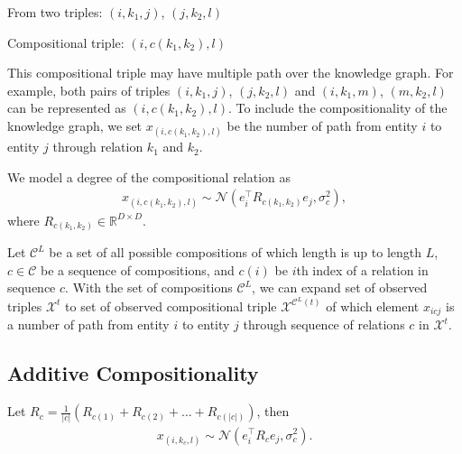 \documentclass{article}
\begin{document}
From two triples:
$(i, k_1 ,j)$,  $(j, k_2, l)$

Compositional triple:
$(i, {c}(k_1, k_2), l)$

This compositional triple may have multiple path over the knowledge graph. For example, both pairs of triples $(i, k_1 ,j)$,  $(j, k_2, l)$ and $(i, k_1 ,m)$,  $(m, k_2, l)$ can be represented as $(i, {c}(k_1, k_2), l)$. To include the compositionality of the knowledge graph, we set  $x_{(i, {{c}(k_1, k_2)}, l)}$ be the number of path from entity $i$ to entity $j$ through relation $k_1$ and $k_2$.

We model a degree of the compositional relation as
\begin{align}
x_{(i, {{c}(k_1, k_2)}, l)} \sim \mathcal{N}(e_i^\top R_{{c}(k_1,k_2)} e_j, \sigma_{c}^2),
\end{align}
where $R_{{c}(k_1,k_2)} \in \mathbb{R}^{D\times D}$.

Let $\mathcal{C}^{L}$ be a set of all possible compositions of which length is up to length $L$, $c \in \mathcal{C}$ be a sequence of compositions, and $c(i)$ be $i$th index of a relation in sequence $c$. With the set of compositions $\mathcal{C}^{L}$, we can expand set of observed triples $\mathcal{X}^{t}$ to set of observed compositional triple $\mathcal{X}^{\mathcal{C}^{L}(t)}$ of which element $x_{icj}$ is a number of path from entity $i$ to entity $j$ through sequence of relations $c$ in $\mathcal{X}^{t}$.

\subsection{Additive Compositionality}
Let $R_{{c}} = \frac{1}{|c|}(R_{c(1)} + R_{c(2)} + \dots + R_{c(|c|)})$, then
\begin{align}
x_{(i, k_{{c}}, l)} \sim \mathcal{N}(e_i^\top R_c e_j, \sigma_{c}^2).
\end{align}
\end{document}
